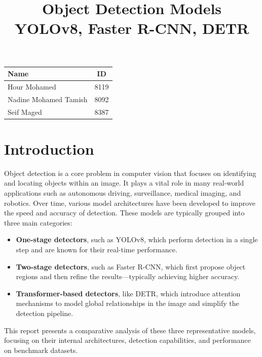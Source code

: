 \documentclass[12pt,a4paper]{article}
\title{\textbf{Object Detection Models \\ YOLOv8, Faster R-CNN, DETR}}
\begin{document}
\maketitle

\vspace{12cm}

\begin{table}[H]
    \centering
    \renewcommand{\arraystretch}{1.5} %
    \setlength{\tabcolsep}{20pt}      %
    \begin{tabularx}{0.8\textwidth}{|X|c|}
        \hline
        \textbf{Name} & \textbf{ID} \\
        \hline
        Hour Mohamed   & 8119 \\
        Nadine Mohamed Tamish & 8092 \\
        Seif Maged     & 8387 \\
        \hline
    \end{tabularx}
\end{table}

\newpage
\tableofcontents
\newpage

\section{Introduction}

Object detection is a core problem in computer vision that focuses on identifying and locating objects within an image. It plays a vital role in many real-world applications such as autonomous driving, surveillance, medical imaging, and robotics.
Over time, various model architectures have been developed to improve the speed and accuracy of detection. These models are typically grouped into three main categories:
\begin{itemize}
    \item \textbf{One-stage detectors}, such as YOLOv8, which perform detection in a single step and are known for their real-time performance.
    \item \textbf{Two-stage detectors}, such as Faster R-CNN, which first propose object regions and then refine the results—typically achieving higher accuracy.
    \item \textbf{Transformer-based detectors}, like DETR, which introduce attention mechanisms to model global relationships in the image and simplify the detection pipeline.
\end{itemize}

This report presents a comparative analysis of these three representative models, focusing on their internal architectures, detection capabilities, and performance on benchmark datasets.
\end{document}

